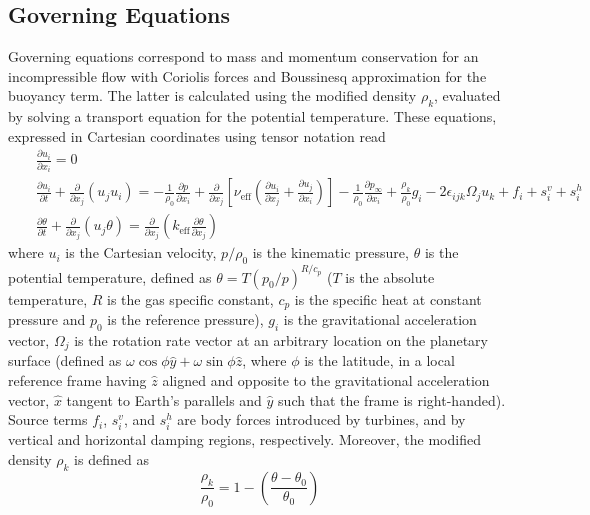 \documentclass[journal abbreviation, manuscript]{copernicus}
\begin{document}
\subsection{Governing Equations}
\label{subsec:governingEquations}
Governing equations correspond to mass and momentum conservation for an incompressible flow with Coriolis forces and Boussinesq approximation for the buoyancy term. The latter is calculated using the modified density $\rho_k$, evaluated by solving a transport equation for the potential temperature. These equations, expressed in Cartesian coordinates using tensor notation read
\begin{eqnarray}
	&&\frac{\partial u_i}{\partial x_i} = 0 \label{eq:massCartesian} \\
	&&\frac{\partial u_i}{\partial t} + \frac{\partial}{\partial x_j}\left(u_j u_i\right) = -\frac{1}{\rho_0}\frac{\partial p}{\partial x_i} + \frac{\partial}{\partial x_j}\left[\nu_\text{eff}\left(\frac{\partial u_i}{\partial x_j} + \frac{\partial u_j}{\partial x_i}\right)\right] - \frac{1}{\rho_0}\frac{\partial p_{\infty}}{\partial x_i}+\frac{\rho_k}{\rho_0}g_i - 2\epsilon_{ijk}\Omega_j u_k + f_i + s^v_i + s^h_i \label{eq:momentumCartesian} \\
	&&\frac{\partial\theta}{\partial t} + \frac{\partial}{\partial x_j}\left(u_j\theta\right) = \frac{\partial}{\partial x_j}\left(k_\text{eff}\frac{\partial \theta}{\partial x_j}\right) \label{eq:temperatureCartesian}
\end{eqnarray}
where $u_i$ is the Cartesian velocity, $p/\rho_0$ is the kinematic pressure, $\theta$ is the potential temperature, defined as $\theta = T(p_0/p)^{R/c_p}$ ($T$ is the absolute temperature, $R$ is the gas specific constant, $c_p$ is the specific heat at constant pressure and $p_0$ is the reference pressure), $g_i$ is the gravitational acceleration vector, $\Omega_j$ is the rotation rate vector at an arbitrary location on the planetary surface (defined as $\omega\cos\phi\widehat{y}+\omega\sin\phi\widehat{z}$, where $\phi$ is the latitude, in a local reference frame having $\widehat{z}$ aligned and opposite to the gravitational acceleration vector, $\widehat{x}$ tangent to Earth's parallels and $\widehat{y}$ such that the frame is right-handed). Source terms $f_i$, $s^v_i$, and $s^h_i$ are body forces introduced by turbines, and by vertical and horizontal damping regions, respectively. Moreover, the modified density $\rho_k$ is defined as
\begin{equation}
	\frac{\rho_k}{\rho_0} = 1 - \left(\frac{\theta-\theta_0}{\theta_0}\right) \label{eq:modifiedDensity}
\end{equation}
\end{document}
